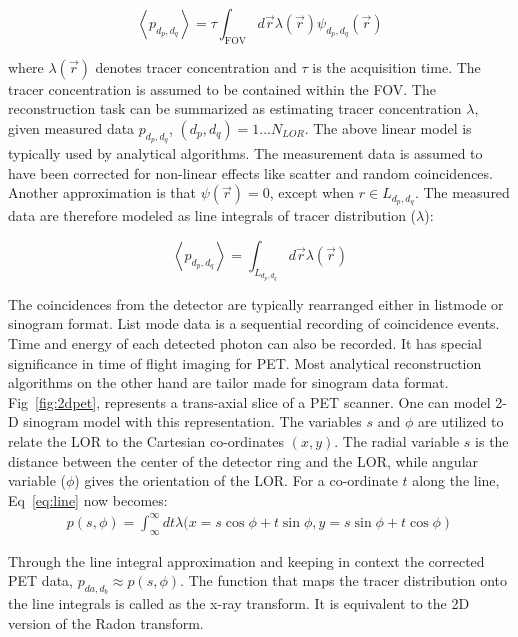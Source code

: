 \begin{equation}\label{eq:analy}
\left\langle p_{d_{p},d_{q}}\right\rangle=\tau \int_{\mathrm{FOV}} d \vec{r} \lambda(\vec{r}) \psi_{d_{p}, d_{q}}(\vec{r})
\end{equation}

where $\lambda(\vec{r})$ denotes tracer concentration and $\tau$ is the acquisition time. The tracer concentration is assumed to be contained within the \ac{FOV}. The reconstruction task can be summarized as estimating tracer concentration $\lambda$, given measured data $p_{d_{p},d_{q}}$, $(d_{p},d_{q})=1\dots N_{LOR}$. The above linear model is typically used by analytical algorithms. The measurement data is assumed to have been corrected for non-linear effects like scatter and random coincidences. Another approximation is that $\psi(\vec{r})=0$, except when $r\in L_{d_{p},d_{q}} $. The measured data are therefore modeled as line integrals of tracer distribution ($\lambda$): 

\begin{equation}
\label{eq:line}
\left\langle p_{d_{p}, d_{q}}\right\rangle=\int_{L_{d_{p}, d_{q}}} d \vec{r} \lambda(\vec{r})
\end{equation}

The coincidences from the detector are typically rearranged either in listmode or sinogram format. List mode data is a sequential recording of coincidence events. Time and energy of each detected photon can also be recorded. It has special significance in time of flight imaging for \ac{PET}. Most analytical reconstruction algorithms on the other hand are tailor made for sinogram data format. Fig~\ref{fig:2dpet}, represents a trans-axial slice of a \ac{PET} scanner. One can model 2-D sinogram model with this representation. The variables $s$ and $\phi$ are utilized to relate the \ac{LOR} to the Cartesian co-ordinates $(x,y)$. The radial variable $s$ is the distance between the center of the detector ring and the \ac{LOR}, while angular variable ($\phi$) gives the orientation of the \ac{LOR}. 
For a co-ordinate $t$ along the line, Eq~\ref{eq:line} now becomes:
\begin{equation}\label{eq:line_sino}
\begin{array}{c}
p\left(s, \phi\right)=\int_{\infty}^{\infty} d t \lambda(x= s \cos\phi +t \sin \phi, 
\left.y=s \sin \phi + t \cos \phi\right)
\end{array}
\end{equation}

Through the line integral approximation and keeping in context the corrected \ac{PET} data, $p_{d{a},d_{b}}\approx p(s,\phi)$. The function that maps the tracer distribution onto the line integrals is called as the x-ray transform. It is equivalent to the 2D version of the Radon transform. 


